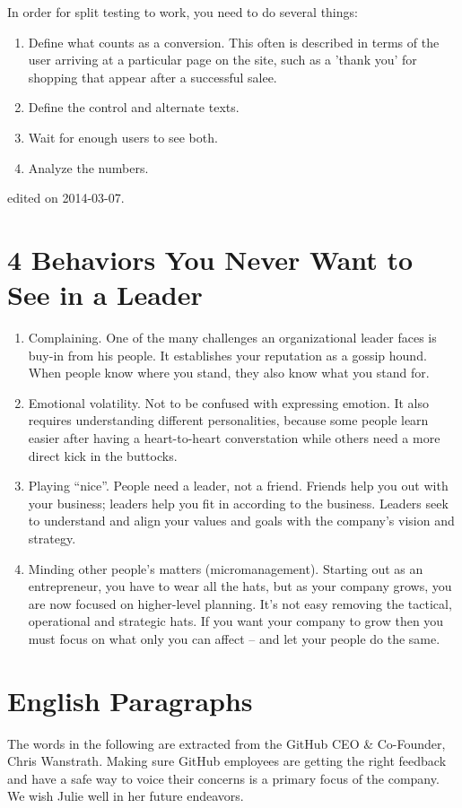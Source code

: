 In order for split testing to work, 
you need to do several things:
\begin{enumerate}
    \item Define what counts as a conversion.
        This often is described in terms of the user
        arriving at a particular page on the site, 
        such as a 'thank you' for shopping that appear
        after a successful salee.
    \item Define the control and alternate texts.
    \item Wait for enough users to see both.
    \item Analyze the numbers.
\end{enumerate}
\hfill {\tiny edited on 2014-03-07.}
\section{ 4 Behaviors You Never Want to See in a Leader}
\begin{enumerate}
    \item Complaining. One of the many challenges an organizational leader faces is buy-in from his people. 
        It establishes your reputation as a gossip hound.
        When people know where you stand, they also know what you stand for.
    \item Emotional volatility. Not to be confused with expressing emotion. It also requires understanding different personalities, because some people learn easier after having a heart-to-heart converstation while others need a more direct kick in the buttocks.
    \item Playing ``nice''.  People need a leader, not a friend. Friends help you out with your business; leaders help you fit in according to the business. Leaders seek to understand and align your values and goals with the company's vision and strategy.
    \item Minding other people's matters (micromanagement). Starting out as an entrepreneur, you have to wear all the hats, but as your company grows, you are now focused on higher-level planning. It's not easy removing the tactical, operational and strategic hats. If you want your company to grow then you must focus on what only you can affect -- and let your people do the same.
\end{enumerate}

\section{English Paragraphs}
The words in the following are extracted from the GitHub CEO \& Co-Founder, Chris Wanstrath.
Making sure GitHub employees are getting the right feedback and have a safe way to voice their concerns is a primary focus of the company.
We wish Julie well in her future endeavors.

